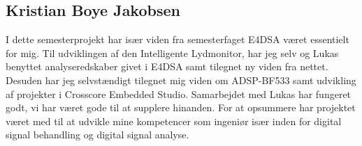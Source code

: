\subsection*{Kristian Boye Jakobsen}
I dette semesterprojekt har især viden fra semesterfaget E4DSA været essentielt for mig. Til udviklingen af den Intelligente Lydmonitor, har jeg selv og Lukas benyttet analyseredskaber givet i E4DSA samt tilegnet ny viden fra nettet. 
Desuden har jeg selvstændigt tilegnet mig viden om ADSP-BF533 samt udvikling af projekter i Crosscore Embedded Studio.
Samarbejdet med Lukas har fungeret godt, vi har været gode til at supplere hinanden.
For at opsummere har projektet været med til at udvikle mine kompetencer som ingeniør især inden for digital signal behandling og digital signal analyse. 
